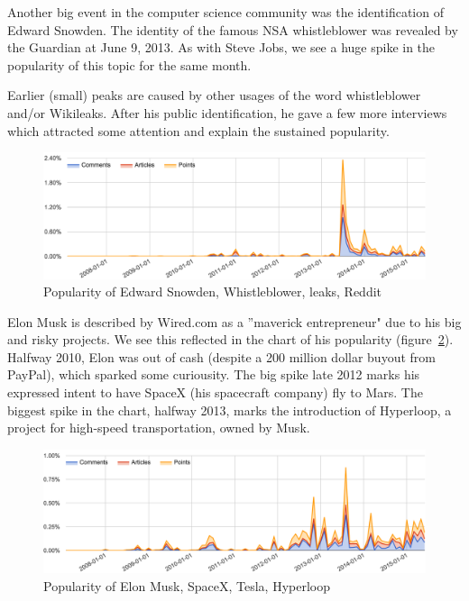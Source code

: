Another big event in the computer science community was the identification of Edward Snowden. The identity of the famous NSA whistleblower was revealed by the Guardian at June 9, 2013. As with Steve Jobs, we see a huge spike in the popularity of this topic for the same month.

Earlier (small) peaks are caused by other usages of the word whistleblower and/or Wikileaks. After his public identification, he gave a few more interviews which attracted some attention and explain the sustained popularity.
\begin{figure}[H] %
	\caption{Popularity of Edward Snowden, Whistleblower, leaks, Reddit}
	\label{fig:trend_snowden}
	\centering
	\includegraphics[width=14cm]{topic_trends/snowden_relative}
\end{figure}

Elon Musk is described by Wired.com as a ''maverick entrepreneur" due to his big and risky projects. We see this reflected in the chart of his popularity (figure~\ref{fig:trend_elon}). Halfway 2010, Elon was out of cash (despite a 200 million dollar buyout from PayPal), which sparked some curiousity. The big spike late 2012 marks his expressed intent to have SpaceX (his spacecraft company) fly to Mars. The biggest spike in the chart, halfway 2013, marks the introduction of Hyperloop, a project for high-speed transportation, owned by Musk.
\begin{figure}[H] %
	\caption{Popularity of Elon Musk, SpaceX, Tesla, Hyperloop}
	\label{fig:trend_elon}
	\centering
	\includegraphics[width=14cm]{topic_trends/elon_relative}
\end{figure}


